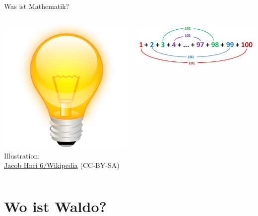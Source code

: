 \documentclass[12pt,compress,ngerman,utf8,t]{beamer}
\newcommand{\withsource}[2]{\begin{center}#1\\\tiny #2\end{center}}
\begin{document}
\begin{frame}{Was ist Mathematik?}
  \pause

  \begin{columns}[c]
    \begin{column}{0.2\textwidth}
      \withsource{
        \includegraphics[width=\textwidth]{idea}
      }{
        Illustration: \\
        \href{https://commons.wikimedia.org/wiki/File:Crystal_Clear_app_ktip.svg}{Jacob
        Hnri 6/Wikipedia} (CC-BY-SA)
      }
    \end{column}

    \begin{column}{0.7\textwidth}
      \includegraphics[width=\textwidth]{kleiner-gauss}
    \end{column}
  \end{columns}
\end{frame}


\section{Wo ist Waldo?}
\end{document}
